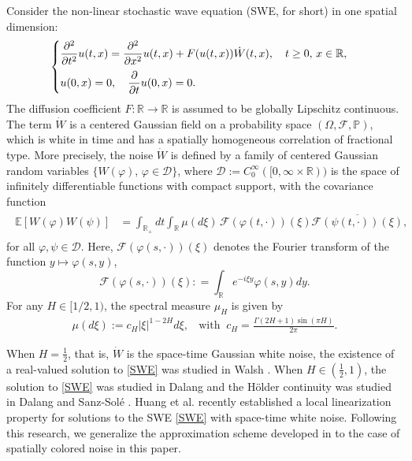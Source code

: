 \documentclass[11pt,reqno]{amsart}
\numberwithin{equation}{section}
\newcommand{\E}{\mathbb E}
\def\R{\mathbb{R}}
\newcommand{\1}{{\bf 1}}
\newcommand{\2}{{\bf 2}}
\begin{document}
Consider the non-linear stochastic wave equation (SWE, for short) in one spatial dimension:
      \begin{equation}\label{SWE}
\begin{cases}
\vspace{6pt}
\displaystyle{\frac{\partial^2}{\partial t^2} u(t, x) =\frac{\partial^2}{\partial x^2} u(t, x) +  F(u(t,x))\dot W(t, x), \quad t\ge 0, \, x \in \mathbb{R},}\\
\displaystyle{u(0, x) = 0, \quad \frac{\partial}{\partial t} u(0, x) =0.}
\end{cases}
\end{equation}
The diffusion coefficient   $F:\mathbb R\rightarrow\mathbb R$  is assumed to be  globally  Lipschitz continuous. The term  $\dot W$ is a centered  Gaussian field on a probability space $(\Omega, \mathcal F, \mathbb P)$, which is  white in time and 
 has a spatially homogeneous correlation of fractional type.   More precisely, the noise $\dot W$ is defined by a family of centered Gaussian random variables $\{W(\varphi), \, \varphi\in \mathcal D\}$, where $\mathcal D:=C_0^{\infty}([0,\infty\times \mathbb R))$ is the space of infinitely differentiable functions with compact support, with the covariance function  
\begin{align}
\begin{aligned}\label{Eq:noise_cov}
\E[W(\varphi) W(\psi)] 
& =  \int_{\R_+} dt \int_\R \mu(d\xi)\, \mathscr{F}(\varphi(t, \cdot))(\xi) \overline{\mathscr{F}(\psi(t, \cdot))(\xi)},
\end{aligned}
\end{align}
for all $\varphi, \psi \in\mathcal D$. Here,  $\mathscr{F}(\varphi(s, \cdot))(\xi)$ denotes the Fourier transform of the function $y \mapsto \varphi(s, y)$,  
\[ \mathscr{F}(\varphi(s, \cdot))(\xi): = \int_\R e^{-i\xi y} \varphi(s, y) dy.
\]
For any $H\in [1/2,1)$, the spectral measure $\mu_H$ is given by  
\begin{align}\label{eq constant}
\mu(d\xi) :=c_H |\xi|^{1-2H} d\xi, \ \   \  \ \text{with }\   c_H = \frac{\Gamma(2H+1)\sin (\pi H)}{2\pi}.
\end{align} 

  When $H=\frac12$, that is, $\dot W$ is the space-time Gaussian white noise,  the   existence  of
  a real-valued   solution to  \eqref{SWE} was studied in Walsh  \cite{Walsh86}.      When $H\in (\frac12,1)$,  the solution to   \eqref{SWE} was studied in  Dalang   \cite{D99} and the H\"older continuity was studied in Dalang and  Sanz-Sol\'e \cite{DS15}.   Huang et al. \cite{HOO2024} recently established a local linearization property for solutions to the  SWE  \eqref{SWE} with space-time white noise. Following this research, we generalize the approximation scheme developed in \cite{HOO2024} to the case of spatially colored noise in this paper.  
   
\end{document}
